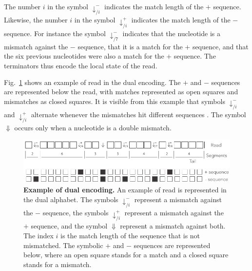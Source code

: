 \documentclass{article}
\begin{document}
The number $i$ in the symbol $\downarrow_{/i}^-$ indicates the match
length of the $+$ sequence. Likewise, the number $i$ in the symbol
$\downarrow_{/i}^+$ indicates the match length of the $-$ sequence. For
instance the symbol $\downarrow_{/7}^-$ indicates that the nucleotide is a
mismatch against the $-$ sequence, that it is a match for the $+$
sequence, and that the six previous nucleotides were also a match for the
$+$ sequence. The terminators thus encode the local state of the read.

Fig.~\ref{fig:dual} shows an example of read in the dual encoding. The $+$
and $-$ sequences are represented below the read, with matches represented
as open squares and mismatches as closed squares. It is visible from this
example that symbols $\downarrow^-_{/i}$ and $\downarrow^+_{/i}$ alternate
whenever the mismatches hit different sequences . The symbol $\Downarrow$
occurs only when a nucleotide is a double mismatch.

\begin{figure}[h]
\centering
\includegraphics[scale=0.85]{sketch_dual.pdf}
\caption{\textbf{Example of dual encoding.}
An example of read is represented in the dual alphabet. The symbols
$\downarrow_{/i}^-$ represent a mismatch against the $-$ sequence, the
symbols $\downarrow_{/i}^+$ represent a mismatch against the $+$ sequence,
and the symbol $\Downarrow$ represent a mismatch against both. The index
$i$ is the match length of the sequence that is not mismatched. The
symbolic $+$ and $-$ sequences are represented below, where an open square
stands for a match and a closed square stands for a mismatch.}
\label{fig:dual}
\end{figure}
\end{document}

